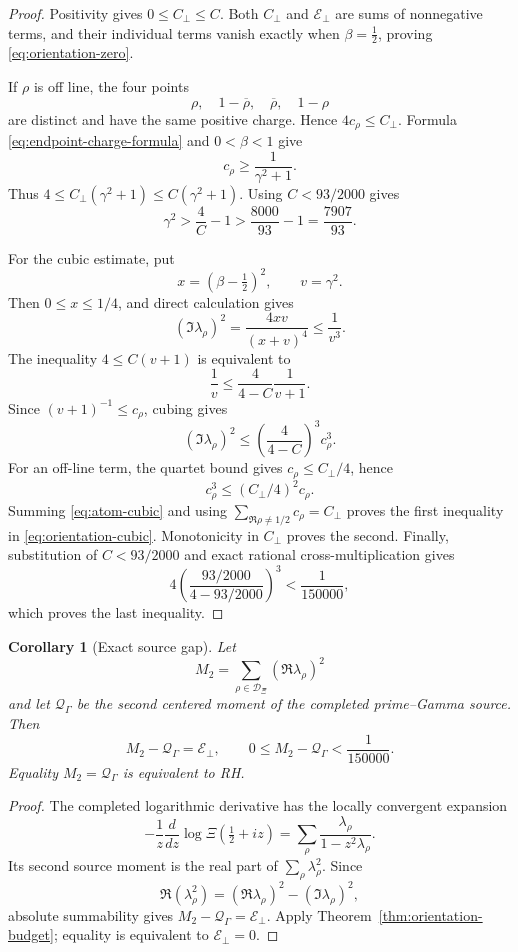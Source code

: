 \documentclass[11pt]{article}
\newtheorem{corollary}[theorem]{Corollary}
\theoremstyle{definition}
\theoremstyle{remark}
\begin{document}
\begin{proof}
Positivity gives \(0\leq C_\perp\leq C\).  Both \(C_\perp\) and
\(\mathcal E_\perp\) are sums of nonnegative terms, and their individual terms vanish exactly
when \(\beta=\tfrac12\), proving \eqref{eq:orientation-zero}.

If \(\rho\) is off line, the four points
\[
 \rho,\quad1-\overline\rho,\quad\overline\rho,\quad1-\rho
 \tag{9.9}
\]
are distinct and have the same positive charge.  Hence \(4c_\rho\leq C_\perp\).  Formula
\eqref{eq:endpoint-charge-formula} and \(0<\beta<1\) give
\[
 c_\rho\geq\frac1{\gamma^2+1}.
 \tag{9.10}
\]
Thus \(4\leq C_\perp(\gamma^2+1)\leq C(\gamma^2+1)\).  Using
\(C<93/2000\) gives
\[
 \gamma^2>\frac4C-1>\frac{8000}{93}-1
 =\frac{7907}{93}.
 \tag{9.11}
\]

For the cubic estimate, put
\[
 x=(\beta-\tfrac12)^2,\qquad v=\gamma^2.
 \]
Then \(0\leq x\leq1/4\), and direct calculation gives
\[
 (\Im\lambda_\rho)^2
 =\frac{4xv}{(x+v)^4}\leq\frac1{v^3}.
 \tag{9.12}
\]
The inequality \(4\leq C(v+1)\) is equivalent to
\[
 \frac1v\leq\frac4{4-C}\frac1{v+1}.
 \tag{9.13}
\]
Since \((v+1)^{-1}\leq c_\rho\), cubing gives
\[
 (\Im\lambda_\rho)^2
 \leq\left(\frac4{4-C}\right)^3c_\rho^3.
 \label{eq:atom-cubic}
 \tag{9.14}
\]
For an off-line term, the quartet bound gives
\(c_\rho\leq C_\perp/4\), hence
\[
 c_\rho^3\leq(C_\perp/4)^2c_\rho.
 \tag{9.15}
\]
Summing \eqref{eq:atom-cubic} and using
\(\sum_{\Re\rho\ne1/2}c_\rho=C_\perp\) proves the first inequality in
\eqref{eq:orientation-cubic}.  Monotonicity in \(C_\perp\) proves the second.  Finally,
substitution of \(C<93/2000\) and exact rational cross-multiplication gives
\[
 4\left(\frac{93/2000}{4-93/2000}\right)^3
 <\frac1{150000},
 \]
which proves the last inequality.
\end{proof}

\begin{corollary}[Exact source gap]\label{cor:source-gap}
Let
\[
 M_2=\sum_{\rho\in\mathcal D_\Xi}(\Re\lambda_\rho)^2
\]
and let \(\mathcal Q_\Gamma\) be the second centered moment of the completed prime--Gamma
source.  Then
\[
 M_2-\mathcal Q_\Gamma=\mathcal E_\perp,\qquad
 0\leq M_2-\mathcal Q_\Gamma<\frac1{150000}.
 \tag{9.17}
\]
Equality \(M_2=\mathcal Q_\Gamma\) is equivalent to RH.
\end{corollary}

\begin{proof}
The completed logarithmic derivative has the locally convergent expansion
\[
 -\frac1z\frac{d}{dz}\log\Xi(\tfrac12+iz)
 =\sum_\rho\frac{\lambda_\rho}{1-z^2\lambda_\rho}.
 \tag{9.18}
\]
Its second source moment is the real part of
\(\sum_\rho\lambda_\rho^2\).  Since
\[
 \Re(\lambda_\rho^2)
 =(\Re\lambda_\rho)^2-(\Im\lambda_\rho)^2,
 \]
absolute summability gives
\(M_2-\mathcal Q_\Gamma=\mathcal E_\perp\).  Apply
Theorem~\ref{thm:orientation-budget}; equality is equivalent to
\(\mathcal E_\perp=0\).
\end{proof}
\end{document}
